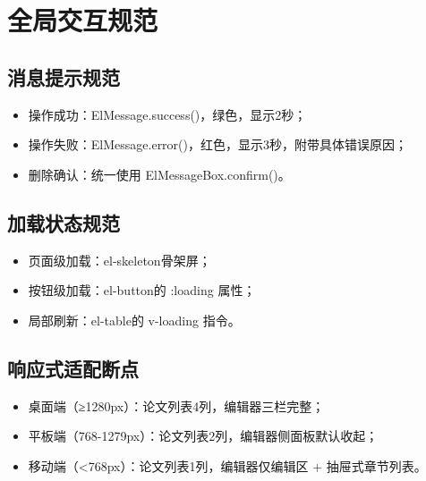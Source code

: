 \section{全局交互规范}

\subsection{消息提示规范}
\begin{itemize}
    \item 操作成功：ElMessage.success()，绿色，显示2秒；
    \item 操作失败：ElMessage.error()，红色，显示3秒，附带具体错误原因；
    \item 删除确认：统一使用 ElMessageBox.confirm()。
\end{itemize}

\subsection{加载状态规范}
\begin{itemize}
    \item 页面级加载：el-skeleton骨架屏；
    \item 按钮级加载：el-button的 :loading 属性；
    \item 局部刷新：el-table的 v-loading 指令。
\end{itemize}

\subsection{响应式适配断点}
\begin{itemize}
    \item 桌面端（≥1280px）：论文列表4列，编辑器三栏完整；
    \item 平板端（768-1279px）：论文列表2列，编辑器侧面板默认收起；
    \item 移动端（<768px）：论文列表1列，编辑器仅编辑区 + 抽屉式章节列表。
\end{itemize}
